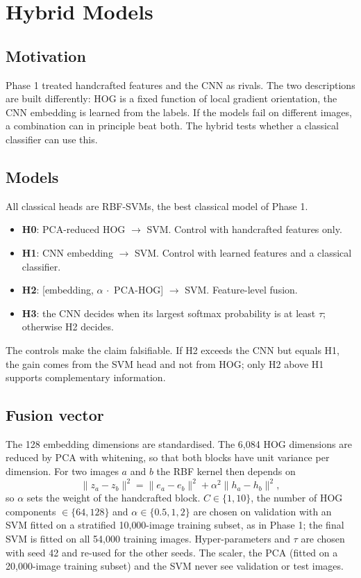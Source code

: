 \section{Hybrid Models}
\label{sec:p2hybrid}
\subsection{Motivation}
Phase 1 treated handcrafted features and the CNN as rivals. The two descriptions are built differently: HOG is a
fixed function of local gradient orientation, the CNN embedding is learned from the labels. If the models fail on
different images, a combination can in principle beat both. The hybrid tests whether a classical classifier can use
this.

\subsection{Models}
All classical heads are RBF-SVMs, the best classical model of Phase 1.
\begin{itemize}
\item \textbf{H0}: PCA-reduced HOG $\rightarrow$ SVM. Control with handcrafted features only.
\item \textbf{H1}: CNN embedding $\rightarrow$ SVM. Control with learned features and a classical classifier.
\item \textbf{H2}: [embedding, $\alpha\,\cdot$ PCA-HOG] $\rightarrow$ SVM. Feature-level fusion.
\item \textbf{H3}: the CNN decides when its largest softmax probability is at least $\tau$; otherwise H2 decides.
\end{itemize}
The controls make the claim falsifiable. If H2 exceeds the CNN but equals H1, the gain comes from the SVM head and
not from HOG; only H2 above H1 supports complementary information.

\subsection{Fusion vector}
The 128 embedding dimensions are standardised. The 6{,}084 HOG dimensions are reduced by PCA with whitening, so that
both blocks have unit variance per dimension. For two images $a$ and $b$ the RBF kernel then depends on
\begin{equation}
\|z_a-z_b\|^2=\|e_a-e_b\|^2+\alpha^2\|h_a-h_b\|^2,
\end{equation}
so $\alpha$ sets the weight of the handcrafted block. $C\in\{1,10\}$, the number of HOG components
$\in\{64,128\}$ and $\alpha\in\{0.5,1,2\}$ are chosen on validation with an SVM fitted on a stratified
10{,}000-image training subset, as in Phase 1; the final SVM is fitted on all 54{,}000 training images.
Hyper-parameters and $\tau$ are chosen with seed 42 and re-used for the other seeds. The scaler, the PCA (fitted on
a 20{,}000-image training subset) and the SVM never see validation or test images.

